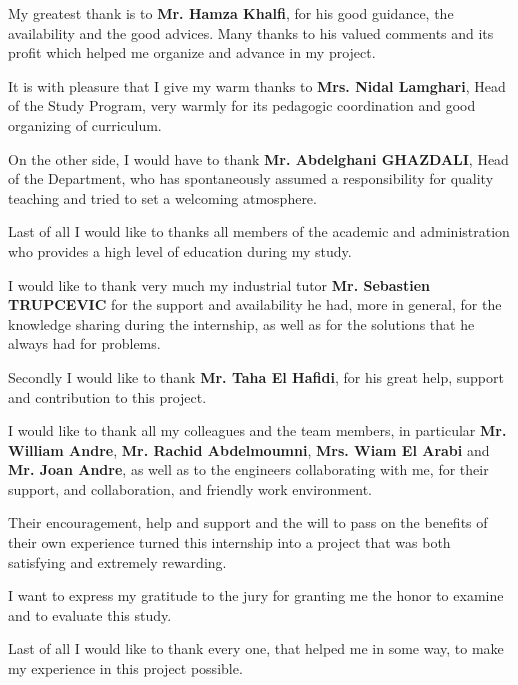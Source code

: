 

My greatest thank is to \textbf{Mr. Hamza Khalfi}, for his good guidance, the availability and the good advices. Many thanks to his valued comments and its profit which helped me organize and advance in my project.

It is with pleasure that I give my warm thanks to \textbf{Mrs. Nidal Lamghari}, Head of the Study Program, very warmly for its pedagogic coordination and good organizing of curriculum.

On the other side, I would have to thank \textbf{Mr. Abdelghani GHAZDALI}, Head of the Department, who has spontaneously assumed a responsibility for quality teaching and tried to set a welcoming atmosphere.

Last of all I would like to thanks all members of the academic and administration who provides a high level of education during my study.



I would like to thank very much my industrial tutor \textbf{Mr. Sebastien TRUPCEVIC} for the support and availability he had, more in general, for the knowledge sharing during the internship, as well as for the solutions that he always had for problems.



Secondly I would like to thank \textbf{Mr. Taha El Hafidi}, for his great help, support and contribution to this project.



I would like to thank all my colleagues and the team members, in particular \textbf{Mr. William Andre}, \textbf{Mr. Rachid Abdelmoumni}, \textbf{Mrs. Wiam El Arabi} and \textbf{Mr. Joan Andre}, as well as to the engineers collaborating with me, for their support, and collaboration, and friendly work environment.



Their encouragement, help and support and the will to pass on the benefits of their own experience turned this internship into a project that was both satisfying and extremely rewarding.

I want to express my gratitude to the jury for granting me the honor to examine and to evaluate this study.

 Last of all I would like to thank every one,  that helped me in some way, to make my experience in this project possible.


\clearpage